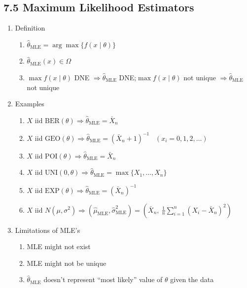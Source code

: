 \documentclass[11pt]{article}
\begin{document}
\subsection*{7.5 Maximum Likelihood Estimators}
\begin{enumerate}[label=\Roman*.]
  \item Definition
  \begin{enumerate}[label=\Alph*.]
    \item $\hat\theta_{\text{MLE}}=\arg\max\{f(x\mid\theta)\}$
    \item $\hat\theta_{\text{MLE}}(x)\in\Omega$
    \item $\max f(x\mid\theta)$ DNE $\Rightarrow \hat\theta_{\text{MLE}}$ DNE;\quad $\max f(x\mid\theta)$ not unique $\Rightarrow \hat\theta_{\text{MLE}}$ not unique
  \end{enumerate}
  \item Examples
  \begin{enumerate}[label=\Alph*.]
    \item $X$ iid $\text{BER}(\theta)\Rightarrow \hat\theta_{\text{MLE}}=\bar X_{n}$
    \item $X$ iid $\text{GEO}(\theta)\Rightarrow \hat\theta_{\text{MLE}}=(\bar X_{n}+1)^{-1}$ \ $(x_{i}=0,1,2,\dots)$
    \item $X$ iid $\text{POI}(\theta)\Rightarrow \hat\theta_{\text{MLE}}=\bar X_{n}$
    \item $X$ iid $\text{UNI}(0,\theta)\Rightarrow \hat\theta_{\text{MLE}}=\max\{X_{1},\dots,X_{n}\}$
    \item $X$ iid $\text{EXP}(\theta)\Rightarrow \hat\theta_{\text{MLE}}=(\bar X_{n})^{-1}$
    \item $X$ iid $N(\mu,\sigma^{2})\Rightarrow (\hat\mu_{\text{MLE}},\hat\sigma^{2}_{\text{MLE}})=\left(\bar X_{n},\ \frac{1}{n}\sum_{i=1}^{n}(X_{i}-\bar X_{n})^{2}\right)$
  \end{enumerate}
  \item Limitations of MLE's
  \begin{enumerate}[label=\Alph*.]
    \item MLE might not exist
    \item MLE might not be unique
    \item $\hat\theta_{\text{MLE}}$ doesn't represent ``most likely'' value of $\theta$ given the data
  \end{enumerate}
\end{enumerate}
\end{document}
